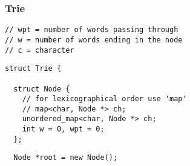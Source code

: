 \documentclass[twoside]{article}
\newcommand{\fileTitleStyle}{\large\underline}
\begin{document}
\begin{multicols*}{2}
\subsubsectionfont{\centering\bfseries\Large}
\subsubsectionfont{\fileTitleStyle}
\subsubsection*{Trie}
\begin{verbatim}
// wpt = number of words passing through
// w = number of words ending in the node
// c = character
\end{verbatim}
\vspace{-12pt}
\begin{verbatim}
struct Trie {

  struct Node {
    // for lexicographical order use 'map'
    // map<char, Node *> ch;
    unordered_map<char, Node *> ch;
    int w = 0, wpt = 0;
  };
\end{verbatim}
\vspace{-12pt}
\begin{verbatim}
  Node *root = new Node();


\end{verbatim}
\end{multicols*}
\end{document}
